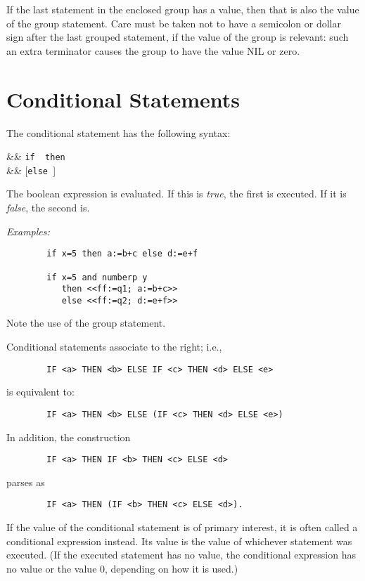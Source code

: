 If the last statement in the enclosed group has a value, then that is also
the value of the group statement.  Care must be taken not to have a
semicolon or dollar sign after the last grouped statement, if the value of
the group is relevant: such an extra terminator causes the group to have
the value NIL or zero.

\section{Conditional Statements}
\hypertarget{command:IF}{}
\hypertarget{reserved:THEN}{}
\hypertarget{reserved:ELSE}{}

The conditional statement
has the following syntax:
\begin{syntaxtable}
  &\BNFprod &
    \texttt{if }\texttt{ then } \\
      && [\texttt{else }]
\end{syntaxtable}
The boolean expression is evaluated. If this is \emph{true}, the first
 is executed.  If it is \emph{false}, the second is.

\textit{Examples:}
\begin{verbatim}
        if x=5 then a:=b+c else d:=e+f

        if x=5 and numberp y
           then <<ff:=q1; a:=b+c>>
           else <<ff:=q2; d:=e+f>>
\end{verbatim}
Note the use of the group statement.

Conditional statements associate to the right; i.e.,
\begin{verbatim}
        IF <a> THEN <b> ELSE IF <c> THEN <d> ELSE <e>
\end{verbatim}
is equivalent to:
\begin{verbatim}
        IF <a> THEN <b> ELSE (IF <c> THEN <d> ELSE <e>)
\end{verbatim}
In addition, the construction
\begin{verbatim}
        IF <a> THEN IF <b> THEN <c> ELSE <d>
\end{verbatim}
parses as
\begin{verbatim}
        IF <a> THEN (IF <b> THEN <c> ELSE <d>).
\end{verbatim}
If the value of the conditional statement is of primary interest, it is often called a conditional
expression instead.  Its value is the value of whichever statement was
executed. (If the executed statement has no value, the conditional
expression has no value or the value 0, depending on how it is used.)

